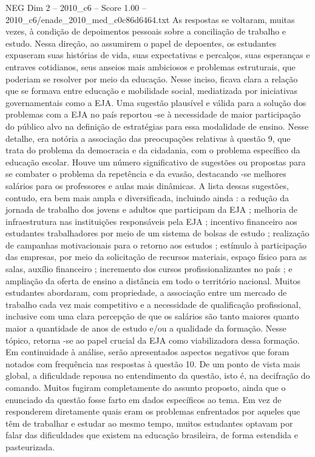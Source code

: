 \begin{textsample}{NEG Dim 2 – 2010\_c6 – Score 1.00 – 2010\_c6/enade\_2010\_med\_c0c86d6464.txt}
As respostas se voltaram, muitas vezes, à condição de depoimentos pessoais sobre a conciliação de trabalho e estudo.
Nessa direção, ao assumirem o papel de depoentes, os estudantes expuseram suas histórias de vida, suas expectativas e percalços, suas esperanças e entraves cotidianos, seus anseios mais ambiciosos e problemas estruturais, que poderiam se resolver por meio da educação.
Nesse inciso, ficava clara a relação que se formava entre educação e mobilidade social, mediatizada por iniciativas governamentais como a EJA.
Uma sugestão plausível e válida para a solução dos problemas com a EJA no país reportou -se à necessidade de maior participação do público alvo na definição de estratégias para essa modalidade de ensino.
Nesse detalhe, era notória a associação das preocupações relativas à questão 9, que trata do problema da democracia e da cidadania, com o problema específico da educação escolar.
Houve um número significativo de sugestões ou propostas para se combater o problema da repetência e da evasão, destacando -se melhores salários para os professores e aulas mais dinâmicas.
A lista dessas sugestões, contudo, era bem mais ampla e diversificada, incluindo ainda : a redução da jornada de trabalho dos jovens e adultos que participam da EJA ; melhoria de infraestrutura nas instituições responsáveis pela EJA ; incentivo financeiro aos estudantes trabalhadores por meio de um sistema de bolsas de estudo ; realização de campanhas motivacionais para o retorno aos estudos ; estímulo à participação das empresas, por meio da solicitação de recursos materiais, espaço físico para as salas, auxílio financeiro ; incremento dos cursos profissionalizantes no país ; e ampliação da oferta de ensino a distância em todo o território nacional.
Muitos estudantes abordaram, com propriedade, a associação entre um mercado de trabalho cada vez mais competitivo e a necessidade de qualificação profissional, inclusive com uma clara percepção de que os salários são tanto maiores quanto maior a quantidade de anos de estudo e/ou a qualidade da formação.
Nesse tópico, retorna -se ao papel crucial da EJA como viabilizadora dessa formação.
Em continuidade à análise, serão apresentados aspectos negativos que foram notados com frequência nas respostas à questão 10.
De um ponto de vista mais global, a dificuldade repousa no entendimento da questão, isto é, na decifração do comando.
Muitos fugiram completamente do assunto proposto, ainda que o enunciado da questão fosse farto em dados específicos ao tema.
Em vez de responderem diretamente quais eram os problemas enfrentados por aqueles que têm de trabalhar e estudar ao mesmo tempo, muitos estudantes optavam por falar das dificuldades que existem na educação brasileira, de forma estendida e pasteurizada.

\end{textsample}
